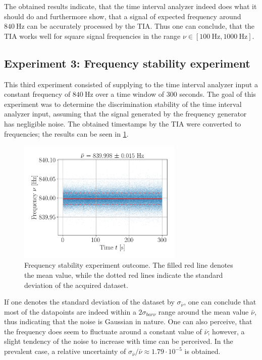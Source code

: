 \documentclass{report}
\numberwithin{tm}{section}
\begin{document}
The obtained results indicate, that the time interval analyzer indeed does what it should do and furthermore show, that a signal of expected frequency around $\SI{840}{\hertz}$ can be accurately processed by the TIA. Thus one can conclude, that the TIA works well for square signal frequencies in the range $\nu \in [\SI{100}{\hertz}, \SI{1000}{\hertz}]$.
\subsection{Experiment 3: Frequency stability experiment}
This third experiment consisted of supplying to the time interval analyzer input a constant frequency of $\SI{840}{\hertz}$ over a time window of 300 seconds. The goal of this experiment was to determine the discrimination stability of the time interval analyzer input, assuming that the signal generated by the frequency generator has negligible noise. The obtained timestamps by the TIA were converted to frequencies; the results can be seen in \cref{fig:freq_stab_exp_scatter}.
\begin{figure}[h]
	\centering
	\includegraphics[width=0.7\textwidth]{figures/freq_stab_exp_scatter.png}
	\caption{Frequency stability experiment outcome. The filled red line denotes the mean value, while the dotted red lines indicate the standard deviation of the acquired dataset.}
	\label{fig:freq_stab_exp_scatter}
\end{figure}

If one denotes the standard deviation of the dataset by $\sigma_{\bar{\nu}}$, one can conclude that most of the datapoints are indeed within a $2\sigma_{bar{\nu}}$ range around the mean value $\bar{\nu}$, thus indicating that the noise is Gaussian in nature. One can also perceive, that the frequency does seem to fluctuate around a constant value of $\bar{\nu}$; however, a slight tendency of the noise to increase with time can be perceived. In the prevalent case, a relative uncertainty of $\sigma_{\bar{\nu}}/\bar{\nu} \approx 1.79\cdot 10^{-5}$ is obtained.
\end{document}
